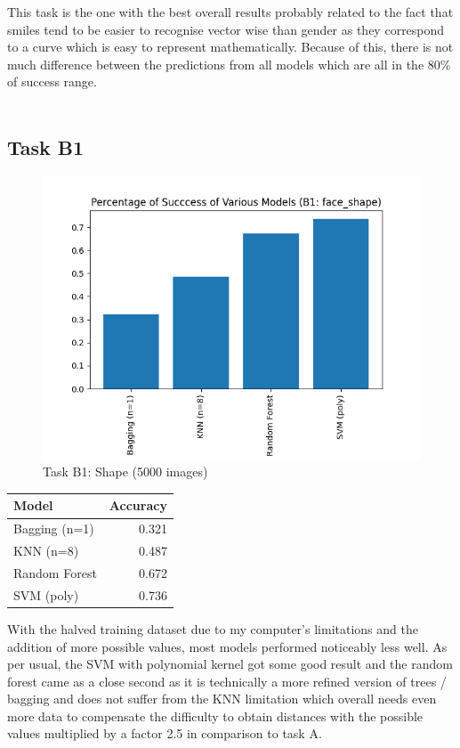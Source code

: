 \documentclass[a4paper,12pt,twoside,twocolumn]{article}
\begin{document}
This task is the one with the best overall results probably related to the fact that smiles tend to be easier to recognise vector wise than gender as they correspond to a curve which is easy to represent mathematically. Because of this, there is not much difference between the predictions from all models which are all in the 80\% of success range.\\

\pagebreak\\
\subsection{Task B1}
\label{sec:org886e2d7}

\begin{center}
\begin{figure}[htbp]
\centering
\includegraphics[width=.9\linewidth]{./images/B1: face_shape.png}
\caption{Task B1: Shape (5000 images)}
\end{figure}
\end{center}

\begin{center}
\begin{tabular}{lr}
Model & Accuracy\\
\hline
Bagging (n=1) & 0.321\\
KNN (n=8) & 0.487\\
Random Forest & 0.672\\
SVM (poly) & 0.736\\
\end{tabular}
\end{center}

With the halved training dataset due to my computer's limitations and the addition of more possible values, most models performed noticeably less well. As per usual, the SVM with polynomial kernel got some good result and the random forest came as a close second as it is technically a more refined version of trees / bagging and does not suffer from the KNN limitation which overall needs even more data to compensate the difficulty to obtain distances with the possible values multiplied by a factor 2.5 in comparison to task A.\\
\end{document}
